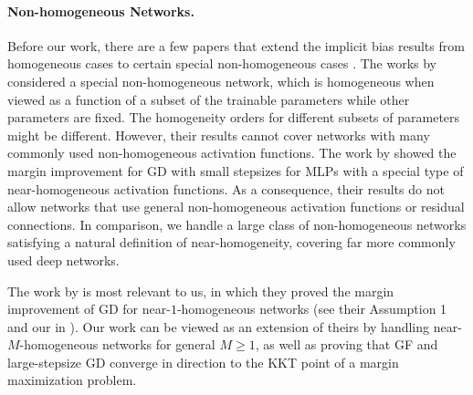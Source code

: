 \paragraph{Non-homogeneous Networks.}
Before our work, there are a few papers that extend the implicit bias results from homogeneous cases to certain special non-homogeneous cases \citep{nacson2019lexicographic,chatterji2021does,kunin2023asymmetric,cai2024large}.
The works by \citet{nacson2019lexicographic,kunin2023asymmetric} considered a special non-homogeneous network, which is homogeneous when viewed as a function of a subset of the trainable parameters while other parameters are fixed. The homogeneity orders for different subsets of parameters might be different. However, their results cannot cover networks with many commonly used non-homogeneous activation functions.
The work by \citet{chatterji2021does} showed the margin improvement for GD with small stepsizes for MLPs with a special type of near-homogeneous activation functions. As a consequence, their results do not allow networks that use general non-homogeneous activation functions or residual connections. 
In comparison, we handle a large class of non-homogeneous networks satisfying a natural definition of near-homogeneity, covering far more commonly used deep networks.

The work by \citet{cai2024large} is most relevant to us, in which they proved the margin improvement of GD for near-$1$-homogeneous networks (see their Assumption 1 and our  in ).
Our work can be viewed as an extension of theirs by handling near-$M$-homogeneous networks for general $M \ge 1$, as well as proving that GF and large-stepsize GD converge in direction to the KKT point of a margin maximization problem. 

